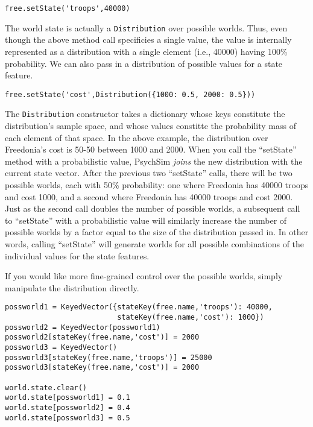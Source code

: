 \documentclass{article}
\begin{document}
\begin{verbatim}
free.setState('troops',40000)
\end{verbatim}

The world state is actually a {\tt Distribution} over possible worlds. Thus, even though the above method call specificies a single value, the value is internally represented as a distribution with a single element (i.e., 40000) having 100\% probability. We can also pass in a distribution of possible values for a state feature.

\begin{verbatim}
free.setState('cost',Distribution({1000: 0.5, 2000: 0.5}))
\end{verbatim}

The {\tt Distribution} constructor takes a dictionary whose keys constitute the distribution's sample space, and whose values constitte the probability mass of each element of that space. In the above example, the distribution over Freedonia's cost is 50-50 between 1000 and 2000. When you call the ``setState'' method with a probabilistic value, PsychSim {\em joins} the new distribution with the current state vector. After the previous two ``setState'' calls, there will be two possible worlds, each with 50\% probability: one where Freedonia has 40000 troops and cost 1000, and a second where Freedonia has 40000 troops and cost 2000. Just as the second call doubles the number of possible worlds, a subsequent call to ``setState'' with a probabilistic value will similarly increase the number of possible worlds by a factor equal to the size of the distribution passed in. In other words, calling ``setState'' will generate worlds for all possible combinations of the individual values for the state features.

If you would like more fine-grained control over the possible worlds, simply manipulate the distribution directly.

\begin{verbatim}
possworld1 = KeyedVector({stateKey(free.name,'troops'): 40000, 
                          stateKey(free.name,'cost'): 1000})
possworld2 = KeyedVector(possworld1)
possworld2[stateKey(free.name,'cost')] = 2000
possworld3 = KeyedVector()
possworld3[stateKey(free.name,'troops')] = 25000
possworld3[stateKey(free.name,'cost')] = 2000

world.state.clear()
world.state[possworld1] = 0.1
world.state[possworld2] = 0.4
world.state[possworld3] = 0.5
\end{verbatim}
\end{document}
